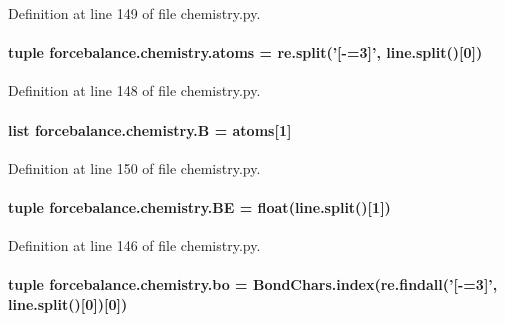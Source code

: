 Definition at line 149 of file chemistry.\-py.

\hypertarget{namespaceforcebalance_1_1chemistry_ab17d5407c5d506aba3077ed57ffd9b97}{
\paragraph[{atoms}]{\setlength{\rightskip}{0pt plus 5cm}tuple forcebalance.\-chemistry.\-atoms = re.\-split('\mbox{[}-\/=3\mbox{]}', line.\-split()\mbox{[}0\mbox{]})}}\label{namespaceforcebalance_1_1chemistry_ab17d5407c5d506aba3077ed57ffd9b97}


Definition at line 148 of file chemistry.\-py.

\hypertarget{namespaceforcebalance_1_1chemistry_a67544d273d0599a13b4c6ad98302ed21}{
\paragraph[{B}]{\setlength{\rightskip}{0pt plus 5cm}list forcebalance.\-chemistry.\-B = {\bf atoms}\mbox{[}1\mbox{]}}}\label{namespaceforcebalance_1_1chemistry_a67544d273d0599a13b4c6ad98302ed21}


Definition at line 150 of file chemistry.\-py.

\hypertarget{namespaceforcebalance_1_1chemistry_a147524ef7449edeb6a5996f861f00d7c}{
\paragraph[{B\-E}]{\setlength{\rightskip}{0pt plus 5cm}tuple forcebalance.\-chemistry.\-B\-E = float(line.\-split()\mbox{[}1\mbox{]})}}\label{namespaceforcebalance_1_1chemistry_a147524ef7449edeb6a5996f861f00d7c}


Definition at line 146 of file chemistry.\-py.

\hypertarget{namespaceforcebalance_1_1chemistry_a69da1f7f7b3940c14cc2b61e2bc64dd0}{
\paragraph[{bo}]{\setlength{\rightskip}{0pt plus 5cm}tuple forcebalance.\-chemistry.\-bo = Bond\-Chars.\-index(re.\-findall('\mbox{[}-\/=3\mbox{]}', line.\-split()\mbox{[}0\mbox{]})\mbox{[}0\mbox{]})}}\label{namespaceforcebalance_1_1chemistry_a69da1f7f7b3940c14cc2b61e2bc64dd0}


